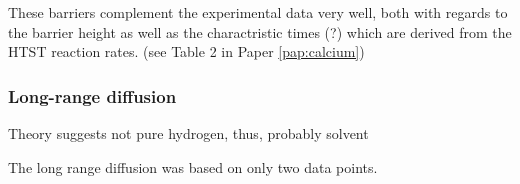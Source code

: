 These barriers complement the experimental data very well, both with regards to the barrier height as well as the charactristic times (?) which are derived from the HTST reaction rates. (see Table 2 in Paper \ref{pap:calcium})

\subsubsection{Long-range diffusion \pending}

\bit
\item Theory suggests not pure hydrogen, thus, probably solvent
\eit

The long range diffusion was based on only two data points.

\incomplete

